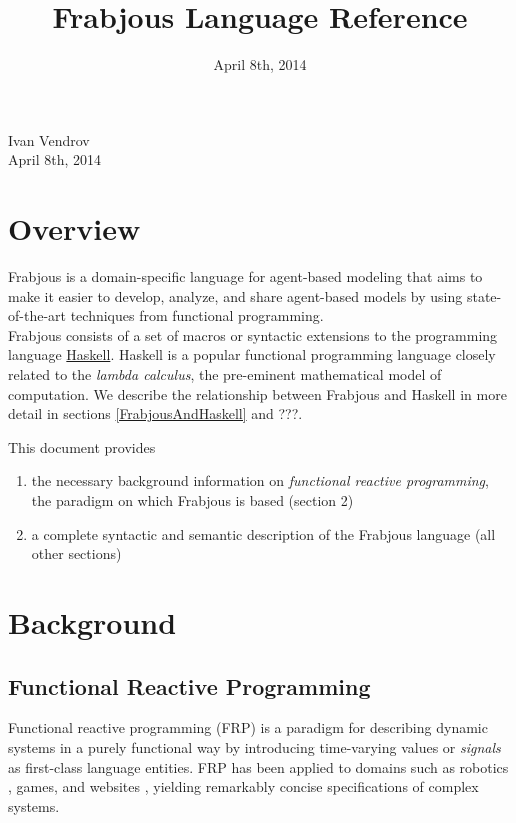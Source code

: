\documentclass{article}
\begin{document}
\lstset{language=Haskell}
%



\title{Frabjous Language Reference}
\date{April 8th, 2014}
\maketitle
{\center Ivan Vendrov \\ April 8th, 2014\\}
\tableofcontents

\section{Overview}
Frabjous is a domain-specific language for agent-based modeling that aims to make it easier to develop, analyze, and share agent-based models by using state-of-the-art techniques from functional programming.\\

Frabjous consists of a set of macros or syntactic extensions to the programming language \href{www.haskell.org}{Haskell}. Haskell is a popular functional programming language closely related to the \emph{lambda calculus}, the pre-eminent mathematical model of computation. We describe the relationship between Frabjous and Haskell in more detail in sections \hyperref[FrabjousAndHaskell]{\ref*{FrabjousAndHaskell}} and ???.

This document provides 
\begin{enumerate}
\item the necessary background information on \emph{functional reactive programming}, the paradigm on which Frabjous is based (section 2)
\item a complete syntactic and semantic description of the Frabjous language (all other sections)
\end{enumerate}
 

\section{Background}
\subsection{Functional Reactive Programming}
Functional reactive programming (FRP) is a paradigm for describing dynamic systems in a purely functional way by introducing time-varying values or \emph{signals} as first-class language entities. FRP has been applied to domains such as robotics \cite{robots}, games\cite{yampa}, and websites \cite{elm}, yielding remarkably concise specifications of complex systems.\\
\end{document}
